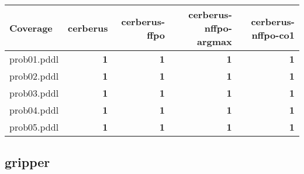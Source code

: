 \documentclass{article}
\begin{document}
\begin{tabular}{@{}lrrrr@{}}
Coverage & cerberus & cerberus-ffpo & cerberus-nffpo-argmax & cerberus-nffpo-co1 \\
\midrule
prob01.pddl & \textbf{1} & \textbf{1} & \textbf{1} & \textbf{1} \\
prob02.pddl & \textbf{1} & \textbf{1} & \textbf{1} & \textbf{1} \\
prob03.pddl & \textbf{1} & \textbf{1} & \textbf{1} & \textbf{1} \\
prob04.pddl & \textbf{1} & \textbf{1} & \textbf{1} & \textbf{1} \\
prob05.pddl & \textbf{1} & \textbf{1} & \textbf{1} & \textbf{1} \\
\end{tabular}

\hypertarget{coverage-gripper}{}
\subsection*{gripper}
\end{document}
